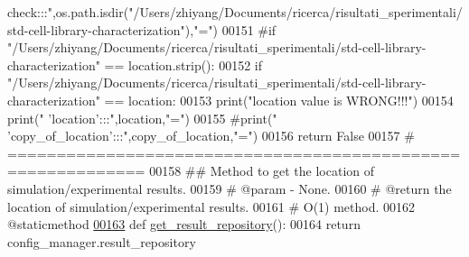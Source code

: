 \begin{DoxyCode}
{       check:::",os.path.isdir("/Users/zhiyang/Documents/ricerca/risultati\_sperimentali/std-cell-library-characterization"),"=")}
00151             \textcolor{comment}{#if "/Users/zhiyang/Documents/ricerca/risultati\_sperimentali/std-cell-library-characterization"
       == location.strip():}
00152             \textcolor{keywordflow}{if} \textcolor{stringliteral}{"/Users/zhiyang/Documents/ricerca/risultati\_sperimentali/std-cell-library-characterization"} 
      == location:
00153                 print(\textcolor{stringliteral}{"location value is WRONG!!!"})
00154             print(\textcolor{stringliteral}{" 'location':::"},location,\textcolor{stringliteral}{"="})
00155             \textcolor{comment}{#print("    'copy\_of\_location':::",copy\_of\_location,"=")}
00156             \textcolor{keywordflow}{return} \textcolor{keyword}{False}
00157     \textcolor{comment}{# ============================================================}
00158     \textcolor{comment}{##  Method to get the location of simulation/experimental results.}
00159     \textcolor{comment}{#   @param - None.}
00160     \textcolor{comment}{#   @return the location of simulation/experimental results.}
00161     \textcolor{comment}{#   O(1) method.}
00162     @staticmethod
\hypertarget{configuration__manager_8py_source_l00163}{}\hyperlink{classutilities_1_1configuration__manager_1_1config__manager_a3e06a71db0338806c87430dc45fbab66}{00163}     \textcolor{keyword}{def }\hyperlink{classutilities_1_1configuration__manager_1_1config__manager_a3e06a71db0338806c87430dc45fbab66}{get\_result\_repository}():
00164         \textcolor{keywordflow}{return} config\_manager.result\_repository
\end{DoxyCode}
